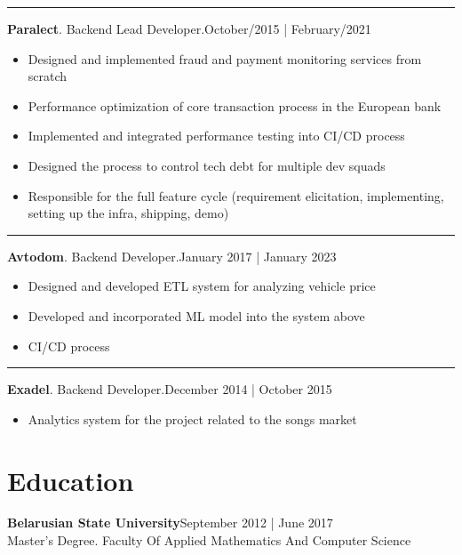 \documentclass{article}
\begin{document}
\par\noindent\rule{\textwidth}{0.4pt}
\textbf{Paralect}. Backend Lead Developer.\hspace*{0pt}\hfill October/2015 | February/2021
\begin{itemize}
    \item Designed and implemented fraud and payment monitoring services from scratch
    \item Performance optimization of core transaction process in the European bank
    \item Implemented and integrated performance testing into CI/CD process
    \item Designed the process to control tech debt for multiple dev squads
    \item Responsible for the full feature cycle (requirement elicitation, implementing, setting up the infra, shipping, demo)
\end{itemize}
\par\noindent\rule{\textwidth}{0.4pt}
\textbf{Avtodom}. Backend Developer.\hspace*{0pt}\hfill January 2017 | January 2023
\begin{itemize}
    \item Designed and developed ETL system for analyzing vehicle price
    \item Developed and incorporated ML model into the system above
    \item CI/CD process
\end{itemize}
\par\noindent\rule{\textwidth}{0.4pt}
\textbf{Exadel}. Backend Developer.\hspace*{0pt}\hfill December 2014 | October 2015

\begin{itemize}
\item Analytics system for the project related to the songs market
\end{itemize}

\vspace{-1.5em}
\section*{Education}
\textbf{Belarusian State University}\hspace*{0pt}\hfill September 2012 | June 2017 \\
Master's Degree. Faculty Of Applied Mathematics And Computer Science
\end{document}
